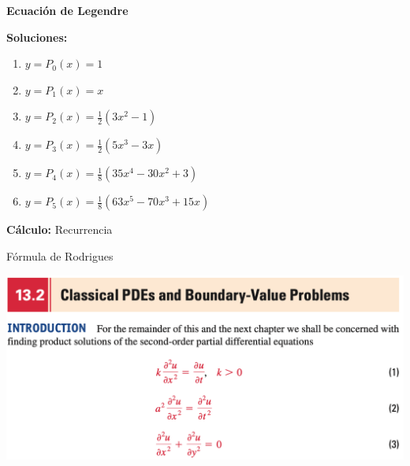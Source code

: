 \documentclass[a4paper,12pt]{article}
\begin{document}
\begin{tcolorbox}[colback=gray!15,colframe=red!1!red,title=Ecuaciones de Legendre]
\textbf{Ecuación de Legendre}
\begin{center}
\end{center}
\textbf{Soluciones:}
\begin{enumerate}
    \item $y=P_0(x)=1$
    \item $y=P_1(x)=x$
    \item $y=P_2(x)=\frac{1}{2}(3x^2-1)$
    \item $y=P_3(x)=\frac{1}{2}(5x^3-3x)$
    \item $y=P_4(x)=\frac{1}{8}(35x^4-30x^2+3)$
    \item $y=P_5(x)=\frac{1}{8}(63x^5-70x^3+15x)$
\end{enumerate}
\textbf{Cálculo:}\newline 
Recurrencia
\begin{center}
\end{center}
Fórmula de Rodrigues
\begin{center}
\end{center}
\end{tcolorbox}

\begin{center}
    \includegraphics[scale=0.4]{images/13,2.png}
\end{center}


%
%
\end{document}
